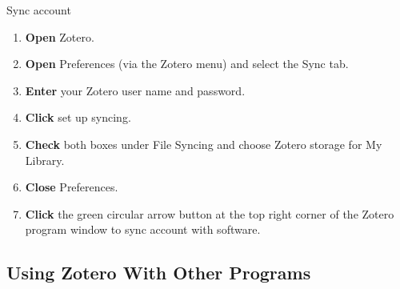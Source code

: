 \documentclass[10pt,a4paper]{article}
\begin{document}
\begin{textbox}{Sync account}
 

  

\begin{enumerate}
\item \textbf{Open} Zotero.
\item \textbf{Open} Preferences (via the Zotero menu) and select the Sync tab.
\item \textbf {Enter} your Zotero user name and password.
\item \textbf {Click} set up syncing.
\item \textbf {Check} both boxes under File Syncing and choose Zotero storage for My Library.
\item \textbf {Close} Preferences.
\item \textbf {Click} the green circular arrow button at the top right corner of the Zotero program window to sync account with software.
\end{enumerate}

\end{textbox}

\subsection{Using Zotero With Other Programs}
\end{document}
